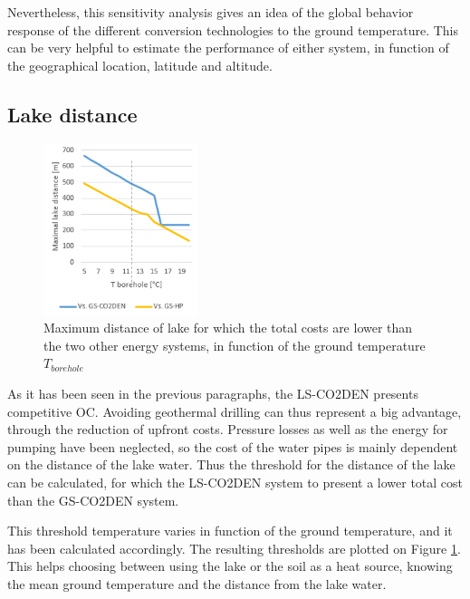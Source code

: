 \documentclass{article}
\begin{document}
Nevertheless, this sensitivity analysis gives an idea of the global behavior response of the different conversion technologies to the ground temperature. This can be very helpful to estimate the performance of either system, in function of the geographical location, latitude and altitude.


\subsection{Lake distance}

\begin{figure} 
	\vspace{-20pt}
	\centering
	\includegraphics[width=0.4\textwidth]{lakeDist.png}
	\caption{Maximum distance of lake for which the total costs are lower than the two other energy systems, in function of the ground temperature $T_{borehole}$}
	\label{fig:lakeDist}
	\vspace{-10pt}
\end{figure}

As it has been seen in the previous paragraphs, the LS-CO2DEN presents competitive OC. Avoiding geothermal drilling can thus represent a big advantage, through the reduction of upfront costs. Pressure losses as well as the energy for pumping have been neglected, so the cost of the water pipes is mainly dependent on the distance of the lake water. Thus the threshold for the distance of the lake can be calculated, for which the LS-CO2DEN system to present a lower total cost than the GS-CO2DEN system. 

This threshold temperature varies in function of the ground temperature, and it has been calculated accordingly. The resulting thresholds are plotted on Figure \ref{fig:lakeDist}. This helps choosing between using the lake or the soil as a heat source, knowing the mean ground temperature and the distance from the lake water.

\end{document}
